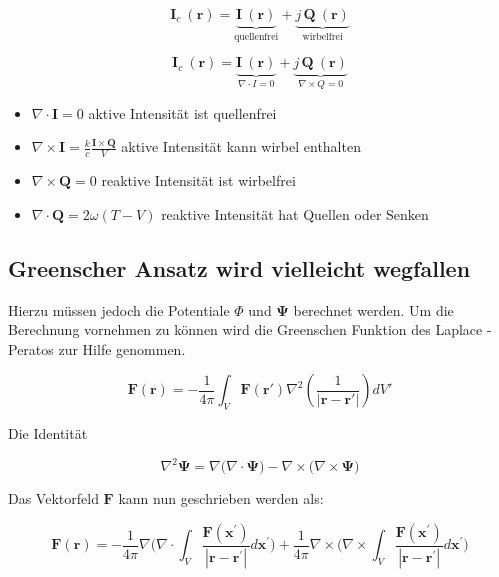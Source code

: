 \begin{equation}
\mathbf{I}_c ~(\mathbf{r}) = \underbrace{\mathbf{I}~(\mathbf{r})}_{\text{quellenfrei}} + \underbrace{j\,\mathbf{Q}~(\mathbf{r})}_{\text{wirbelfrei}}
\label{helmholtz:KomplexeIntensitaet_Zerlegung}
\end{equation}

\begin{equation}
\mathbf{I}_c ~(\mathbf{r}) = \underbrace{\mathbf{I}~(\mathbf{r})}_{\nabla \cdot I = 0} + \underbrace{j\,\mathbf{Q}~(\mathbf{r})}_{\nabla \times Q = 0}
\label{helmholtz:KomplexeIntensitaet_Zerlegung}
\end{equation}

\begin{itemize}
\item $\nabla \cdot \mathbf{I} = 0$ aktive Intensität ist quellenfrei
\item $\nabla \times \mathbf{I} = \frac{k}{c} \frac{\mathbf{I} \times \mathbf{Q}}{V}$ aktive Intensität kann wirbel enthalten
\item $\nabla \times \mathbf{Q} = 0$ reaktive Intensität ist wirbelfrei
\item $\nabla \cdot \mathbf{Q} = 2 \omega (T-V)$ reaktive Intensität hat Quellen oder Senken
\end{itemize}


\subsection{Greenscher Ansatz wird vielleicht wegfallen}
Hierzu müssen jedoch die Potentiale $\Phi $ und $\mathbf{\Psi}$ berechnet werden. Um die Berechnung vornehmen zu können wird die Greenschen Funktion des Laplace -Peratos zur Hilfe genommen. 

\begin{equation}
\mathbf{F}(\mathbf{r}) = -\frac{1}{4\pi} \int_V \mathbf{F}(\mathbf{r}') \nabla^2 \left( \frac{1}{|\mathbf{r} - \mathbf{r}'|} \right) dV'
\end{equation}

Die Identität

\begin{equation}
\nabla^2 \mathbf{\Psi}=\nabla \Big( \nabla \cdot \mathbf{\Psi} \Big)-\nabla \times \Big(\nabla \times \mathbf{\Psi} \Big)
\end{equation}

Das Vektorfeld $\mathbf{F}$ kann nun geschrieben werden als:

\begin{equation}
\mathbf{F}(\mathbf{r}) = - \frac{1}{4 \pi} \nabla \bigg( \nabla \cdot \int_V \frac{\mathbf{F}(\mathbf{x}^{\prime})}{|\mathbf{r} - \mathbf{r}^{\prime}|} d\mathbf{x}^{\prime} \bigg) + \frac{1}{4 \pi} \nabla \times \bigg( \nabla \times \int_V \frac{\mathbf{F}(\mathbf{x}^{\prime})}{|\mathbf{r} - \mathbf{r}^{\prime}|} d\mathbf{x}^{\prime} \bigg)
\end{equation}


